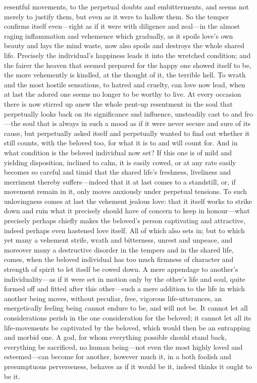 \documentclass[12pt,a4paper]{book}
\begin{document}
resentful movements, to the perpetual doubts and embitterments, and seems
not merely to justify them, but even as it were to hallow them. So the
temper confirms itself even---right as if it were with diligence and
zeal---in the almost raging inflammation and vehemence which gradually, as
it spoils love's own beauty and lays the mind waste, now also spoils and
destroys the whole shared life. Precisely the individual's happiness leads
it into the wretched condition; and the fairer the heaven that seemed
prepared for the happy one showed itself to be, the more vehemently is
kindled, at the thought of it, the terrible hell. To wrath and the most
hostile sensations, to hatred and cruelty, can love now lead, when at last
the adored one seems no longer to be worthy to live. At every occasion
there is now stirred up anew the whole pent-up resentment in the soul that
perpetually looks back on its significance and influence, unsteadily cast
to and fro---the soul that is always in such a mood as if it were never
secure and sure of its cause, but perpetually asked itself and perpetually
wanted to find out whether it still counts, with the beloved too, for what
it is to and will count for. And in what condition is the beloved
individual now set? If this one is of mild and yielding disposition,
inclined to calm, it is easily cowed, or at any rate easily becomes so
careful and timid that the shared life's freshness, liveliness and
merriment thereby suffers---indeed that it at last comes to a standstill,
or, if movement remain in it, only moves anxiously under perpetual
tensions. To such unlovingness comes at last the vehement jealous love:
that it itself works to strike down and ruin what it precisely should have
of concern to keep in honour---what precisely perhaps chiefly makes the
beloved's person captivating and attractive, indeed perhaps even hastened
love itself. All of which also sets in; but to which yet many a vehement
strife, wrath and bitterness, unrest and unpeace, and moreover many a
destructive disorder in the tempers and in the shared life, comes, when the
beloved individual has too much firmness of character and strength of
spirit to let itself be cowed down. A mere appendage to another's
individuality---as if it were set in motion only by the other's life and
soul, quite formed off and fitted after this other---such a mere addition to
the life in which another being moves, without peculiar, free, vigorous
life-utterances, an energetically feeling being cannot endure to be, and
will not be. It cannot let all considerations perish in the one
consideration for the beloved; it cannot let all its life-movements be
captivated by the beloved, which would then be an entrapping and morbid
one. A god, for whom everything possible should stand back, everything be
sacrificed, no human being---not even the most highly loved and
esteemed---can become for another, however much it, in a both foolish and
presumptuous perverseness, behaves as if it would be it, indeed thinks it
ought to be it.
\end{document}
